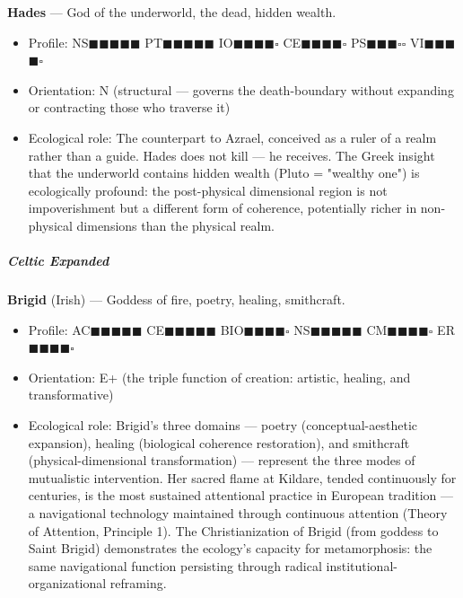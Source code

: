 \textbf{Hades} — God of the underworld, the dead, hidden wealth.

\begin{itemize}[nosep,leftmargin=*]
  \item Profile: NS$\blacksquare$$\blacksquare$$\blacksquare$$\blacksquare$$\blacksquare$ PT$\blacksquare$$\blacksquare$$\blacksquare$$\blacksquare$$\blacksquare$ IO$\blacksquare$$\blacksquare$$\blacksquare$$\blacksquare$$\square$ CE$\blacksquare$$\blacksquare$$\blacksquare$$\blacksquare$$\square$ PS$\blacksquare$$\blacksquare$$\blacksquare$$\square$$\square$ VI$\blacksquare$$\blacksquare$$\blacksquare$$\blacksquare$$\square$
  \item Orientation: N (structural — governs the death-boundary without expanding or contracting those who traverse it)
  \item Ecological role: The counterpart to Azrael, conceived as a ruler of a realm rather than a guide. Hades does not kill — he receives. The Greek insight that the underworld contains hidden wealth (Pluto = "wealthy one") is ecologically profound: the post-physical dimensional region is not impoverishment but a different form of coherence, potentially richer in non-physical dimensions than the physical realm.
\end{itemize}


\subparagraph*{Celtic Expanded}


\textbf{Brigid} (Irish) — Goddess of fire, poetry, healing, smithcraft.

\begin{itemize}[nosep,leftmargin=*]
  \item Profile: AC$\blacksquare$$\blacksquare$$\blacksquare$$\blacksquare$$\blacksquare$ CE$\blacksquare$$\blacksquare$$\blacksquare$$\blacksquare$$\blacksquare$ BIO$\blacksquare$$\blacksquare$$\blacksquare$$\blacksquare$$\square$ NS$\blacksquare$$\blacksquare$$\blacksquare$$\blacksquare$$\blacksquare$ CM$\blacksquare$$\blacksquare$$\blacksquare$$\blacksquare$$\square$ ER$\blacksquare$$\blacksquare$$\blacksquare$$\blacksquare$$\square$
  \item Orientation: E+ (the triple function of creation: artistic, healing, and transformative)
  \item Ecological role: Brigid's three domains — poetry (conceptual-aesthetic expansion), healing (biological coherence restoration), and smithcraft (physical-dimensional transformation) — represent the three modes of mutualistic intervention. Her sacred flame at Kildare, tended continuously for centuries, is the most sustained attentional practice in European tradition — a navigational technology maintained through continuous attention (Theory of Attention, Principle 1). The Christianization of Brigid (from goddess to Saint Brigid) demonstrates the ecology's capacity for metamorphosis: the same navigational function persisting through radical institutional-organizational reframing.
\end{itemize}


